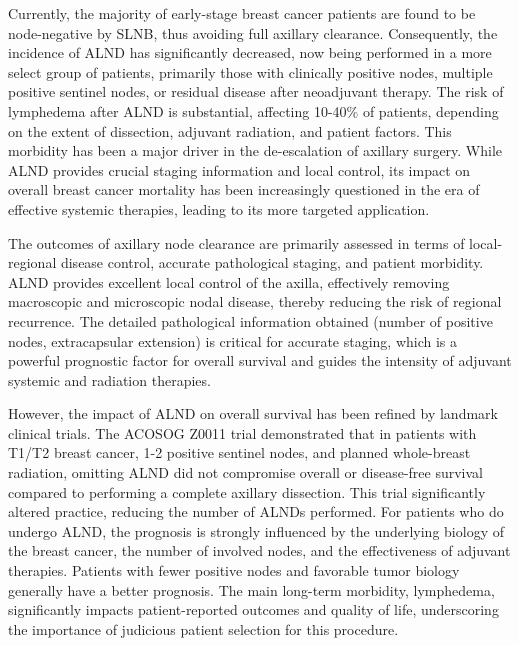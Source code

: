 Currently, the majority of early-stage breast cancer patients are found to be node-negative by SLNB, thus avoiding full axillary clearance. Consequently, the incidence of ALND has significantly decreased, now being performed in a more select group of patients, primarily those with clinically positive nodes, multiple positive sentinel nodes, or residual disease after neoadjuvant therapy. The risk of lymphedema after ALND is substantial, affecting 10-40\% of patients, depending on the extent of dissection, adjuvant radiation, and patient factors. This morbidity has been a major driver in the de-escalation of axillary surgery. While ALND provides crucial staging information and local control, its impact on overall breast cancer mortality has been increasingly questioned in the era of effective systemic therapies, leading to its more targeted application.

The outcomes of axillary node clearance are primarily assessed in terms of local-regional disease control, accurate pathological staging, and patient morbidity. ALND provides excellent local control of the axilla, effectively removing macroscopic and microscopic nodal disease, thereby reducing the risk of regional recurrence. The detailed pathological information obtained (number of positive nodes, extracapsular extension) is critical for accurate staging, which is a powerful prognostic factor for overall survival and guides the intensity of adjuvant systemic and radiation therapies.

However, the impact of ALND on overall survival has been refined by landmark clinical trials. The ACOSOG Z0011 trial demonstrated that in patients with T1/T2 breast cancer, 1-2 positive sentinel nodes, and planned whole-breast radiation, omitting ALND did not compromise overall or disease-free survival compared to performing a complete axillary dissection. This trial significantly altered practice, reducing the number of ALNDs performed. For patients who do undergo ALND, the prognosis is strongly influenced by the underlying biology of the breast cancer, the number of involved nodes, and the effectiveness of adjuvant therapies. Patients with fewer positive nodes and favorable tumor biology generally have a better prognosis. The main long-term morbidity, lymphedema, significantly impacts patient-reported outcomes and quality of life, underscoring the importance of judicious patient selection for this procedure.

